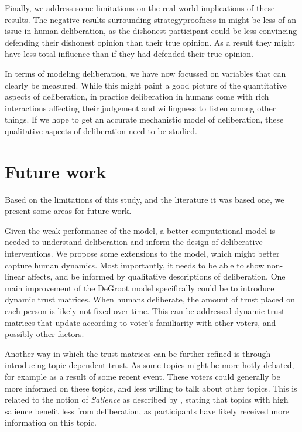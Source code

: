 Finally, we address some limitations on the real-world implications of these results.
The negative results surrounding strategyproofness in  might be less
of an issue in human deliberation, as the dishonest participant could be less convincing
defending their dishonest opinion than their true opinion. As a result they might have less
total influence than if they had defended their true opinion.

In terms of modeling deliberation, we have now focussed on variables that can
clearly be measured. While this might paint a good picture of the quantitative
aspects of deliberation, in practice deliberation in humans come with rich interactions
affecting their judgement and willingness to listen among other things. If we hope to
get an accurate mechanistic model of deliberation, these qualitative aspects of deliberation
need to be studied.









\section{Future work}

Based on the limitations of this study, and the literature it was based one, we present some areas for future work.

Given the weak performance of the model, a better computational model is needed
to understand deliberation and inform the design of deliberative interventions.
We propose some extensions to the model, which might better capture human
dynamics. Most importantly, it needs to be able to show non-linear affects, and
be informed by qualitative descriptions of deliberation. One main improvement of the DeGroot model specifically could be to introduce dynamic trust matrices.
When humans deliberate, the amount of trust placed on each person is likely not
fixed over time. This can be addressed dynamic trust matrices that update according
to voter's familiarity with other voters, and possibly other factors.

Another way in which the trust matrices can be further refined is through
introducing topic-dependent trust. As some topics might be more hotly debated,
for example as a result of some recent event. These voters could generally be
more informed on these topics, and less willing to talk about other topics.
This is related to the notion of \textit{Salience} as described by
\citet{listDeliberationSinglePeakednessPossibility2013}, stating that topics
with high salience benefit less from deliberation, as participants have likely
received more information on this topic.


